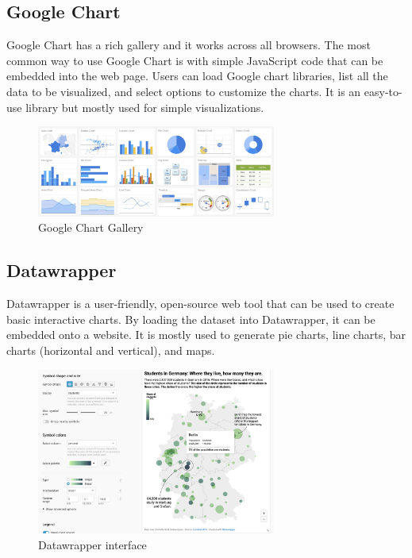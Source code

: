 \subsection{Google Chart}
Google Chart has a rich gallery and it works across all browsers.
The most common way to use Google Chart is with simple JavaScript code that can be embedded into the web page. Users can load Google chart libraries, list all the data to be visualized, and select options to customize the charts. It is an easy-to-use library but mostly used for simple visualizations.

\begin{figure}[H]
\centering
\captionsetup{justification=centering}
\includegraphics[width=0.7\textwidth]{Report-latex/tex_files/pics/charts.png}
\caption{Google Chart Gallery \cite{googlechart}}
\label{fig:google-chart}
\end{figure}

\newpage

\subsection{Datawrapper}
Datawrapper is a user-friendly, open-source web tool that can be used to create basic interactive charts. By loading the dataset into Datawrapper, it can be embedded onto a website. It is mostly used to generate pie charts, line charts, bar charts (horizontal and vertical), and maps. 

\begin{figure}[H]
\centering
\captionsetup{justification=centering}
\includegraphics[width=0.7\textwidth]{Report-latex/tex_files/pics/datar.png}
\caption{Datawrapper interface \cite{datawrapper}}
\label{fig:datawrapper}
\end{figure}

